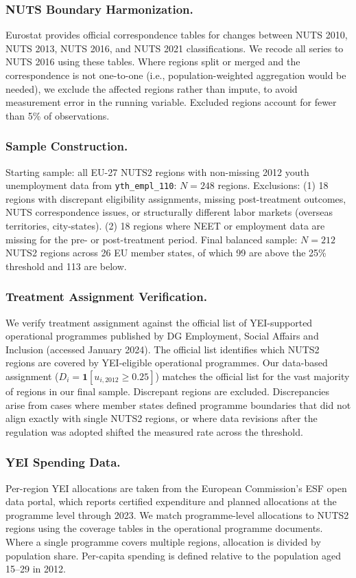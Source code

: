 \documentclass[12pt]{article}
\begin{document}
\subsubsection*{NUTS Boundary Harmonization.} Eurostat provides official correspondence tables for changes between NUTS 2010, NUTS 2013, NUTS 2016, and NUTS 2021 classifications. We recode all series to NUTS 2016 using these tables. Where regions split or merged and the correspondence is not one-to-one (i.e., population-weighted aggregation would be needed), we exclude the affected regions rather than impute, to avoid measurement error in the running variable. Excluded regions account for fewer than 5\% of observations.

\subsubsection*{Sample Construction.} Starting sample: all EU-27 NUTS2 regions with non-missing 2012 youth unemployment data from \texttt{yth\_empl\_110}: $N = 248$ regions. Exclusions: (1) 18 regions with discrepant eligibility assignments, missing post-treatment outcomes, NUTS correspondence issues, or structurally different labor markets (overseas territories, city-states). (2) 18 regions where NEET or employment data are missing for the pre- or post-treatment period. Final balanced sample: $N = 212$ NUTS2 regions across 26 EU member states, of which 99 are above the 25\% threshold and 113 are below.

\subsubsection*{Treatment Assignment Verification.} We verify treatment assignment against the official list of YEI-supported operational programmes published by DG Employment, Social Affairs and Inclusion (accessed January 2024). The official list identifies which NUTS2 regions are covered by YEI-eligible operational programmes. Our data-based assignment ($D_i = \mathbf{1}[u_{i,2012} \geq 0.25]$) matches the official list for the vast majority of regions in our final sample. Discrepant regions are excluded. Discrepancies arise from cases where member states defined programme boundaries that did not align exactly with single NUTS2 regions, or where data revisions after the regulation was adopted shifted the measured rate across the threshold.

\subsubsection*{YEI Spending Data.} Per-region YEI allocations are taken from the European Commission's ESF open data portal, which reports certified expenditure and planned allocations at the programme level through 2023. We match programme-level allocations to NUTS2 regions using the coverage tables in the operational programme documents. Where a single programme covers multiple regions, allocation is divided by population share. Per-capita spending is defined relative to the population aged 15--29 in 2012.
\end{document}
